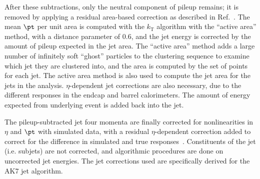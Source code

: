 
After these subtractions, only the neutral component of pileup remains;
it is removed by applying a residual area-based correction as described in
Ref.~\cite{jetarea_fastjet,jetarea_fastjet_pu}. 
The mean $\pt$ per unit area
is computed with the $k_{\mathrm T}$ algorithm with the ``active area'' method,
with a distance parameter of 0.6, and the
jet energy is corrected by the amount of pileup expected in the jet
area. The ``active area'' method adds a large number of infinitely
soft ``ghost'' particles to the clustering sequence to examine which
jet they are clustered into, and the area is computed by the set of
points for each jet. The active area method is also used to compute
the jet area for the jets in the analysis. 
$\eta$-dependent jet corrections are also necessary,
due to the different responses in the endcap
and barrel calorimeters. The amount of energy expected from underlying
event is added back into the jet. 


The pileup-subtracted jet four momenta are finally 
corrected for nonlinearities in $\eta$ and $\pt$
with simulated data, with a residual $\eta$-dependent correction added 
to correct for the difference in simulated and true responses~\cite{jec_spring10}.  Constituents
of the jet (i.e. subjets) are not corrected, and algorithmic procedures are done on uncorrected jet
energies. 
The jet corrections used are specifically derived for the AK7 jet algorithm.





